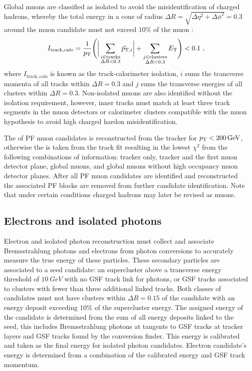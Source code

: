 Global muons are classified as isolated to avoid the misidentification of charged hadrons, whereby the total energy in a cone of radius ${\Delta R=\sqrt{\Delta\eta^2+\Delta\phi^2}=0.3}$ around the muon candidate must not exceed $10\%$ of the muon \pt:
%
\begin{equation}
    I_{\mathrm{track,calo}} = \frac{1}{\pt}\Biggl(\bigg|\sum_{\substack{i\in \mathrm{tracks}\\\Delta R<0.3}} \vec{p}_{\mathrm{T},i}\bigg| + \sum_{\substack{j\in \mathrm{clusters}\\\Delta R<0.3}}E_{\mathrm{T}}\Biggr) < 0.1\ ,
\end{equation}
%
where $I_{\mathrm{track,calo}}$ is known as the track-calorimeter isolation, $i$ sums the transverse momenta of all tracks within $\Delta R=0.3$ and $j$ sums the transverse energies of all clusters within $\Delta R=0.3$.  Non-isolated muons are also identified without the isolation requirement, however, inner tracks must match at least three track segments in the muon detectors or calorimeter clusters compatible with the muon hypothesis to avoid high \pt charged hardon misidentification.

The \pt of PF muon candidates is reconstructed from the tracker for ${p_{\text{T}}<\SI{200}{GeV}}$, otherwise the \pt is taken from the track fit resulting in the lowest $\chi^2$ from the following combinations of information: tracker only, tracker and the first muon detector plane, global muons, and global muons without high occupancy muon detector planes. After all PF muon candidates are identified and reconstructed the associated PF blocks are removed from further candidate identification. Note that under certain conditions charged hadrons may later be revised as muons.


\subsection{Electrons and isolated photons}

Electron and isolated photon reconstruction must collect and associate Bremsstrahlung photons and electrons from photon conversions to accurately measure the true energy of these particles. These secondary particles are associated to a seed candidate: an \ECAL supercluster above a transverse energy threshold of ${\SI{10}{GeV}}$ with no GSF track link for photons, or GSF tracks associated to \ECAL clusters with fewer than three additional linked tracks. Both classes of candidates must not have \HCAL clusters within ${\Delta R=0.15}$ of the candidate with an energy deposit exceeding $10\%$ of the supercluster energy. The assigned energy of the candidate is determined from the sum of all energy deposits linked to the seed, this includes Bremsstrahlung photons at tangents to GSF tracks at tracker layers and GSF tracks found by the conversion finder. This energy is calibrated and taken as the final energy for isolated photon candidates. Electron candidate's energy is determined from a combination of the calibrated \ECAL energy and GSF track momentum.

